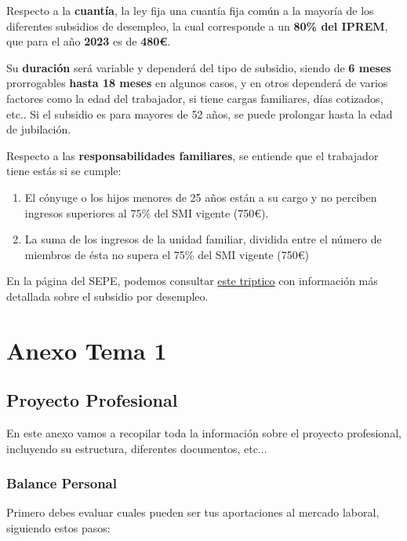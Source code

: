 Respecto a la \textbf{cuantía}, la ley fija una cuantía fija común a la mayoría de los diferentes subsidios de desempleo, la cual corresponde a un \textbf{80\% del IPREM}, que para el año \textbf{2023} es de \textbf{480€}.

Su \textbf{duración} será variable y dependerá del tipo de subsidio, siendo de \textbf{6 meses} prorrogables \textbf{hasta 18 meses} en algunos casos, y en otros dependerá de varios factores como la edad del trabajador, si tiene cargas familiares, días cotizados, etc.. Si el subsidio es para mayores de 52 años, se puede prolongar hasta la edad de jubilación.

Respecto a las \textbf{responsabilidades familiares}, se entiende que el trabajador tiene estás si se cumple:

\begin{enumerate}
    \item El cónyuge o los hijos menores de 25 años están a su cargo y no perciben ingresos superiores al 75\% del SMI vigente (750€).
    \item La suma de los ingresos de la unidad familiar, dividida entre el número de miembros de ésta no supera el 75\% del SMI vigente (750€)
\end{enumerate}

En la página del SEPE, podemos consultar \href{https://www.seg-social.es/wps/portal/wss/internet/InformacionUtil/44539/47006}{este triptico} con información más detallada sobre el subsidio por desempleo.



\chapter{Anexo Tema 1}

\section{Proyecto Profesional}
En este anexo vamos a recopilar toda la información sobre el proyecto profesional, incluyendo su estructura, diferentes documentos, etc...

\subsection{Balance Personal}
Primero debes evaluar cuales pueden ser tus aportaciones al mercado laboral, siguiendo estos pasos:

